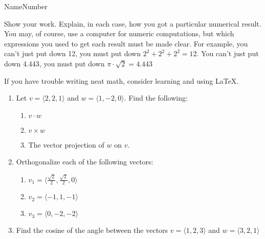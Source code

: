 \documentclass{article}
\newcommand{\vect}[1]{\langle #1 \rangle}
\begin{document}
\bigskip

\noindent Name\hrulefill Number \hrulefill

Show your work.  Explain, in each case, how you got a particular
numerical result.  You may, of course, use a computer for numeric
computations, but which expressions you used to get each result must
be made clear.  For example, you can't just put down 12, you must put
down $2^2 + 2^2 + 2^2 = 12$.  You can't just put down 4.443, you
must put down $\pi\cdot\sqrt{2} = 4.443$

If you have trouble writing neat math, consider learning and using \LaTeX.

\begin{enumerate}
\item Let $v=\vect{2,2,1}$ and $w=\vect{1,-2,0}$.  Find the following:
  \begin{enumerate}
  \item $v\cdot w$
\vfill
  \item $v\times w$
\vfill
  \item The vector projection of $w$ on $v$.
\vfill
  \end{enumerate}

\item Orthogonalize each of the following vectors:
  \begin{enumerate}
  \item $v_1 = \vect{\frac{\sqrt{2}}{2}, \frac{\sqrt{2}}{2}, 0}$
\vfill
  \item $v_2 = \vect{-1,1,-1}$
\vfill
  \item $v_3 = \vect{0,-2,-2}$
\vfill
  \end{enumerate}

\item Find the cosine of the angle between the vectors
  $v=\vect{1,2,3}$ and $w=\vect{3,2,1}$
\vfill


\end{enumerate}
\end{document}
